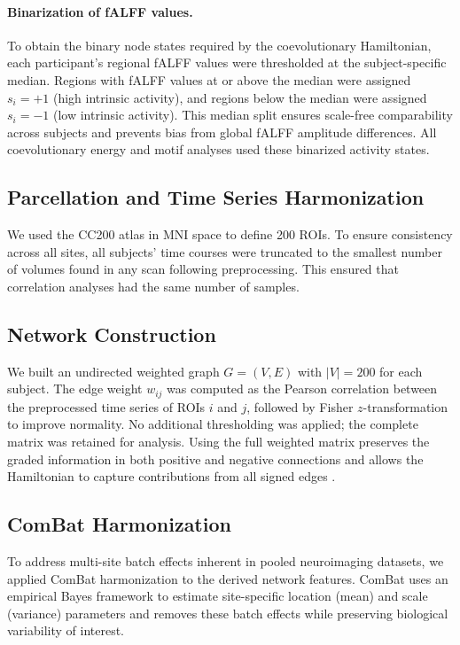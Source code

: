 \documentclass[10pt,letterpaper]{article}
\begin{document}
\paragraph*{Binarization of fALFF values.}
To obtain the binary node states required by the coevolutionary Hamiltonian, each participant's
regional fALFF values were thresholded at the subject-specific median. Regions with fALFF values
at or above the median were assigned $s_i = +1$ (high intrinsic activity), and regions below the
median were assigned $s_i = -1$ (low intrinsic activity). This median split ensures scale-free
comparability across subjects and prevents bias from global fALFF amplitude differences. All
coevolutionary energy and motif analyses used these binarized activity states.

\subsection*{Parcellation and Time Series Harmonization}
We used the CC200 atlas in MNI space to define 200 ROIs. To ensure consistency across all sites,
all subjects' time courses were truncated to the smallest number of volumes found in any scan
following preprocessing. This ensured that correlation analyses had the same number of samples.

\subsection*{Network Construction}
We built an undirected weighted graph $G=(V,E)$ with $|V|=200$ for each subject. The edge weight
$w_{ij}$ was computed as the Pearson correlation between the preprocessed time series of ROIs $i$
and $j$, followed by Fisher $z$-transformation to improve normality. No additional thresholding was
applied; the complete matrix was retained for analysis. Using the full weighted matrix preserves
the graded information in both positive and negative connections and allows the Hamiltonian to
capture contributions from all signed edges \cite{Smith:2013fc,Fornito2016}.

\subsection*{ComBat Harmonization}
To address multi-site batch effects inherent in pooled neuroimaging datasets, we applied ComBat
harmonization \cite{Johnson2007,Fortin2017} to the derived network features. ComBat uses an
empirical Bayes framework to estimate site-specific location (mean) and scale (variance) parameters
and removes these batch effects while preserving biological variability of interest.
\end{document}
